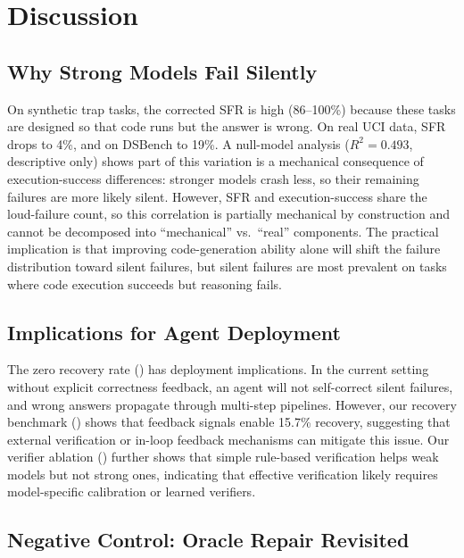 \section{Discussion}
\label{sec:disc}

\subsection{Why Strong Models Fail Silently}
\label{sec:disc-why}

On synthetic trap tasks, the corrected SFR is high (86--100\%) because these tasks are designed so that code runs but the answer is wrong. On real UCI data, SFR drops to 4\%, and on DSBench to 19\%. A null-model analysis ($R^2 = 0.493$, descriptive only) shows part of this variation is a mechanical consequence of execution-success differences: stronger models crash less, so their remaining failures are more likely silent. However, SFR and execution-success share the loud-failure count, so this correlation is partially mechanical by construction and cannot be decomposed into ``mechanical'' vs.\ ``real'' components. The practical implication is that improving code-generation ability alone will shift the failure distribution toward silent failures, but silent failures are most prevalent on tasks where code execution succeeds but reasoning fails.

\subsection{Implications for Agent Deployment}
\label{sec:disc-impl}

The zero recovery rate () has deployment implications. In the current setting without explicit correctness feedback, an agent will not self-correct silent failures, and wrong answers propagate through multi-step pipelines. However, our recovery benchmark () shows that feedback signals enable 15.7\% recovery, suggesting that external verification or in-loop feedback mechanisms can mitigate this issue. Our verifier ablation () further shows that simple rule-based verification helps weak models but not strong ones, indicating that effective verification likely requires model-specific calibration or learned verifiers.

\subsection{Negative Control: Oracle Repair Revisited}
\label{sec:disc-negative-control}


